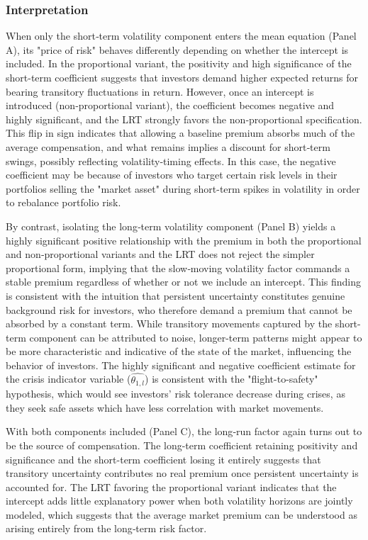 \documentclass[12pt]{article}
\begin{document}
\subsubsection{Interpretation}
When only the short‐term volatility component enters the mean equation (Panel A), its "price of risk" behaves differently depending on whether the intercept is included. In the proportional variant, the positivity and high significance of the short-term coefficient suggests that investors demand higher expected returns for bearing transitory fluctuations in return. However, once an intercept is introduced (non‑proportional variant), the coefficient becomes negative and highly significant, and the LRT strongly favors the non‑proportional specification. This flip in sign indicates that allowing a baseline premium absorbs much of the average compensation, and what remains implies a discount for short‐term swings, possibly reflecting volatility‐timing effects. In this case, the negative coefficient may be because of investors who target certain risk levels in their portfolios selling the "market asset" during short-term spikes in volatility in order to rebalance portfolio risk.\par
By contrast, isolating the long‑term volatility component (Panel B) yields a highly significant positive relationship with the premium in both the proportional and non‑proportional variants and the LRT does not reject the simpler proportional form, implying that the slow‐moving volatility factor commands a stable premium regardless of whether or not we include an intercept. This finding is consistent with the intuition that persistent uncertainty constitutes genuine background risk for investors, who therefore demand a premium that cannot be absorbed by a constant term. While transitory movements captured by the short-term component can be attributed to noise, longer-term patterns might appear to be more characteristic and indicative of the state of the market, influencing the behavior of investors. The highly significant and negative coefficient estimate for the crisis indicator variable ($\widehat{\theta_{1,l}}$) is consistent with the "flight-to-safety" hypothesis, which would see investors' risk tolerance decrease during crises, as they seek safe assets which have less correlation with market movements.\par
With both components included (Panel C), the long‑run factor again turns out to be the source of compensation. The long-term coefficient retaining positivity and significance and the short-term coefficient losing it entirely suggests that transitory uncertainty contributes no real premium once persistent uncertainty is accounted for. The LRT favoring the proportional variant indicates that the intercept adds little explanatory power when both volatility horizons are jointly modeled, which suggests that the average market premium can be understood as arising entirely from the long‑term risk factor.\par
\end{document}
